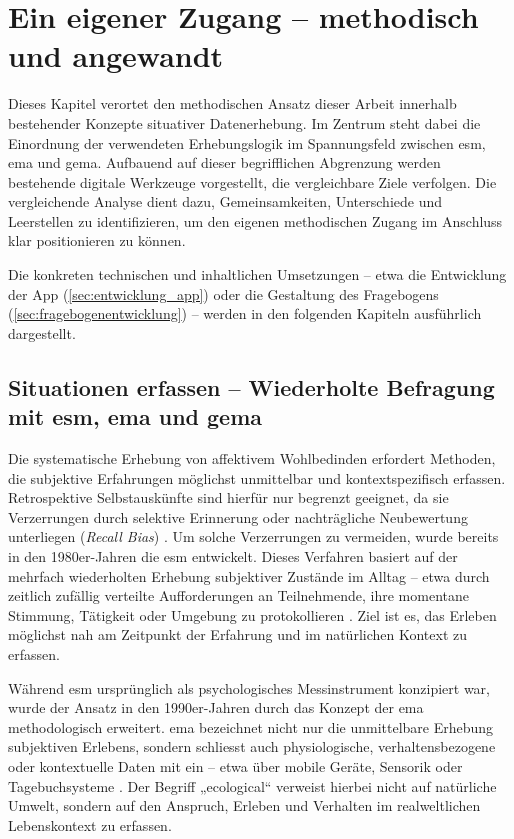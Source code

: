 
\section{Ein eigener Zugang – methodisch und angewandt} \label{sec:methodik}

Dieses Kapitel verortet den methodischen Ansatz dieser Arbeit innerhalb bestehender Konzepte situativer Datenerhebung. Im Zentrum steht dabei die Einordnung der verwendeten Erhebungslogik im Spannungsfeld zwischen \acrfull{esm}, \acrfull{ema} und \acrfull{gema}. Aufbauend auf dieser begrifflichen Abgrenzung werden bestehende digitale Werkzeuge vorgestellt, die vergleichbare Ziele verfolgen. Die vergleichende Analyse dient dazu, Gemeinsamkeiten, Unterschiede und Leerstellen zu identifizieren, um den eigenen methodischen Zugang im Anschluss klar positionieren zu können.

Die konkreten technischen und inhaltlichen Umsetzungen – etwa die Entwicklung der App (\cref{sec:entwicklung_app}) oder die Gestaltung des Fragebogens (\cref{sec:fragebogenentwicklung}) – werden in den folgenden Kapiteln ausführlich dargestellt.


\subsection{Situationen erfassen – Wiederholte Befragung mit \acrshort{esm}, \acrshort{ema} und \acrshort{gema}}

Die systematische Erhebung von affektivem Wohlbedinden erfordert Methoden, die subjektive Erfahrungen möglichst unmittelbar und kontextspezifisch erfassen. Retrospektive Selbstauskünfte sind hierfür nur begrenzt geeignet, da sie Verzerrungen durch selektive Erinnerung oder nachträgliche Neubewertung unterliegen (\textit{Recall Bias}) \parencite{kahnemanDevelopmentsMeasurementSubjective2006}. Um solche Verzerrungen zu vermeiden, wurde bereits in den 1980er-Jahren die \acrfull{esm} entwickelt. Dieses Verfahren basiert auf der mehrfach wiederholten Erhebung subjektiver Zustände im Alltag – etwa durch zeitlich zufällig verteilte Aufforderungen an Teilnehmende, ihre momentane Stimmung, Tätigkeit oder Umgebung zu protokollieren \parencite{csikszentmihalyiValidityReliabilityExperienceSampling1987}. Ziel ist es, das Erleben möglichst nah am Zeitpunkt der Erfahrung und im natürlichen Kontext zu erfassen.

Während \acrshort{esm} ursprünglich als psychologisches Messinstrument konzipiert war, wurde der Ansatz in den 1990er-Jahren durch das Konzept der \acrfull{ema} methodologisch erweitert. \acrshort{ema} bezeichnet nicht nur die unmittelbare Erhebung subjektiven Erlebens, sondern schliesst auch physiologische, verhaltensbezogene oder kontextuelle Daten mit ein – etwa über mobile Geräte, Sensorik oder Tagebuchsysteme \parencite{shiffmanEcologicalMomentaryAssessment2008}. Der Begriff „ecological“ verweist hierbei nicht auf natürliche Umwelt, sondern auf den Anspruch, Erleben und Verhalten im realweltlichen Lebenskontext zu erfassen.


